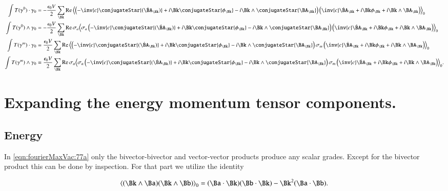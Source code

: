 \begin{subequations}
\label{eqn:fourierMaxVac:77}
\begin{align}
\int T(\gamma^0) \cdot \gamma_0
&= -\frac{\epsilon_0 V }{2} \sum_{\Bk}
\Real \gpgradezero{
\left( -\inv{c} \conjugateStar{(\dot{\BA}_{\Bk})} + i \Bk \conjugateStar{\phi_{\Bk}} - i \Bk \wedge \conjugateStar{\BA_{\Bk}} \right) 
\left( \inv{c} \dot{\BA}_\Bk + i \Bk \phi_\Bk + i \Bk \wedge \BA_\Bk \right) 
} 
\label{eqn:fourierMaxVac:77a}
\\
\int T(\gamma^0) \wedge \gamma_0
&= -\frac{\epsilon_0 V}{2} \sum_{\Bk}
\Real \sigma_a \gpgradezero{ \sigma_a
\left( -\inv{c} \conjugateStar{(\dot{\BA}_{\Bk})} + i \Bk \conjugateStar{\phi_{\Bk}} - i \Bk \wedge \conjugateStar{\BA_{\Bk}} \right) 
\left( \inv{c} \dot{\BA}_\Bk + i \Bk \phi_\Bk + i \Bk \wedge \BA_\Bk \right) 
} 
\label{eqn:fourierMaxVac:77b}
\\
\int T(\gamma^m) \cdot \gamma_0
&= \frac{\epsilon_0 V }{2} \sum_{\Bk}
\Real \gpgradezero{
\left( -\inv{c} \conjugateStar{(\dot{\BA}_{\Bk})} + i \Bk \conjugateStar{\phi_{\Bk}} - i \Bk \wedge \conjugateStar{\BA_{\Bk}} \right) 
\sigma_m
\left( \inv{c} \dot{\BA}_\Bk + i \Bk \phi_\Bk + i \Bk \wedge \BA_\Bk \right) 
} 
\label{eqn:fourierMaxVac:77c}
\\
\int T(\gamma^m) \wedge \gamma_0
&= \frac{\epsilon_0 V}{2} \sum_{\Bk}
\Real \sigma_a \gpgradezero{ \sigma_a
\left( -\inv{c} \conjugateStar{(\dot{\BA}_{\Bk})} + i \Bk \conjugateStar{\phi_{\Bk}} - i \Bk \wedge \conjugateStar{\BA_{\Bk}} \right) 
\sigma_m
\left( \inv{c} \dot{\BA}_\Bk + i \Bk \phi_\Bk + i \Bk \wedge \BA_\Bk \right) 
}
\label{eqn:fourierMaxVac:77d}
.
\end{align}
\end{subequations}

\section{Expanding the energy momentum tensor components.}

\subsection{Energy}

In \autoref{eqn:fourierMaxVac:77a} only the bivector-bivector and vector-vector products produce any scalar grades.  Except for the bivector product this can be done by inspection.  For that part we utilize the identity

\begin{align}\label{eqn:fourierMaxVac:90}
\gpgradezero{ (\Bk \wedge \Ba) (\Bk \wedge \Bb) }
= (\Ba \cdot \Bk) (\Bb \cdot \Bk) - \Bk^2 (\Ba \cdot \Bb).
\end{align}

